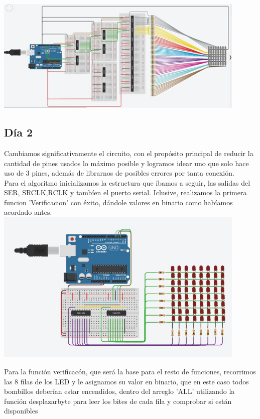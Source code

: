 \documentclass{article}
\begin{document}
    \includegraphics[width=12cm]{Dia 1.jpeg}



\subsection{Día 2}
Cambiamos significativamente el circuito, con el propósito principal de reducir la cantidad de pines usados lo máximo posible y logramos idear uno que solo hace uso de 3 pines, además de librarnos de posibles errores por tanta conexión.\\
Para el algoritmo inicializamos la estructura que íbamos a seguir, las salidas del SER, SRCLK,RCLK y tambíen el puerto serial. Iclusive, realizamos la primera funcion 'Verificacion' con éxito, dándole valores en binario como habíamos acordado antes.\\

\includegraphics[width=12cm]{Dia 2.jpeg}

\vspace{0.5cm}

Para la función verificacón, que será la base para el resto de funciones, recorrimos las 8 filas de los LED y le asignamos su valor en binario, que en este caso todos bombillos deberían estar encendidos, dentro del arreglo 'ALL' utilizando la función desplazarbyte para leer los bites de cada fila y comprobar si están disponibles\\
\end{document}
